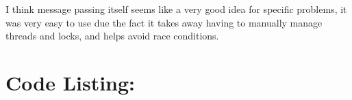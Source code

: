 \documentclass[fleqn]{report}
\begin{document}
I think message passing itself seems like a very good idea for specific 
problems, it was very easy to use due the fact it takes away having
to manually manage threads and locks, and helps avoid race conditions.
  
\newpage
\section*{Code Listing:}


\end{document}
